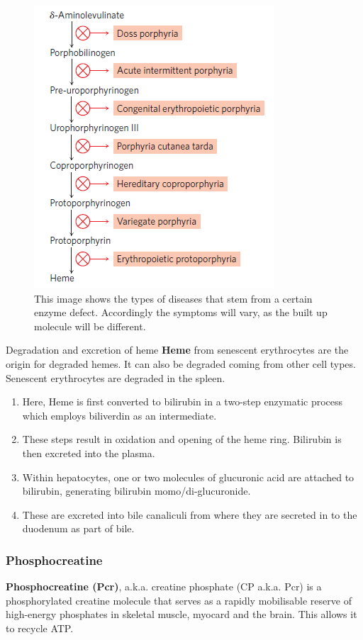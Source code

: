 \documentclass[../main.tex]{subfiles}
\begin{document}
\begin{figure}[H]
	\centering
	\includegraphics[width=0.3\linewidth]{por_sick}
	\caption{This image shows the types of diseases that stem from a certain enzyme defect. Accordingly the symptoms will vary, as the built up molecule will be different.}
	\label{fig:porsick}
\end{figure}

\begin{RemarkWithTitel}{Degradation and excretion of heme}
	\textbf{\gls{Heme}} from senescent erythrocytes are the origin for degraded hemes. It can also be degraded coming from other cell types. Senescent erythrocytes are degraded in the spleen. 
	\begin{enumerate}
		\item Here, Heme is first converted to bilirubin in a two-step enzymatic process which employs biliverdin as an intermediate.
		\item These steps result in oxidation and opening of the heme ring. Bilirubin is then excreted into the plasma.
		\item Within hepatocytes, one or two molecules of glucuronic acid are attached to bilirubin, generating bilirubin momo/di-glucuronide. 
		\item These are excreted into bile canaliculi from where they are secreted in to the duodenum as part of bile.
	\end{enumerate} 
	
\end{RemarkWithTitel}


\subsubsection{Phosphocreatine}

\textbf{\gls{Phosphocreatine (Pcr)}}, a.k.a. creatine phosphate (CP a.k.a. Pcr) is a phosphorylated creatine molecule that serves as a rapidly mobilisable reserve of high-energy phosphates in skeletal muscle, myocard and the brain. This allows it to recycle ATP. 
\end{document}
